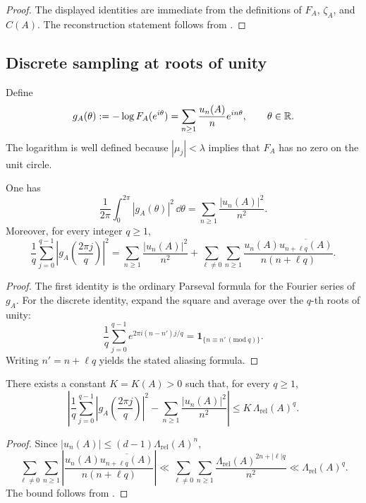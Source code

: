 \begin{proof}
  The displayed identities are immediate from the definitions of
  \(F_A\), \(\zeta_A\), and \(C(A)\). The reconstruction statement
  follows from
  .
\end{proof}

\subsection{Discrete sampling at roots of unity}

Define
\[
  g_A(\theta):=-\log F_A(e^{i\theta})
  =\sum_{n\ge 1}\frac{u_n(A)}{n}e^{in\theta},
  \qquad \theta\in\mathbb{R}.
\]
The logarithm is well defined because \(|\mu_j|<\lambda\) implies that
\(F_A\) has no zero on the unit circle.

\begin{theorem}
  \label{thm:finite-part-nyquist-parseval-aliasing}
  One has
  \[
    \frac{1}{2\pi}\int_0^{2\pi}|g_A(\theta)|^2\,\dd\theta
    =\sum_{n\ge 1}\frac{|u_n(A)|^2}{n^2}.
  \]
  Moreover, for every integer \(q\ge 1\),
  \[
    \frac{1}{q}\sum_{j=0}^{q-1}
      \left|g_A\!\left(\frac{2\pi j}{q}\right)\right|^2
    =
    \sum_{n\ge 1}\frac{|u_n(A)|^2}{n^2}
    +\sum_{\ell\ne 0}\sum_{n\ge 1}
      \frac{u_n(A)\overline{u_{n+\ell q}(A)}}{n(n+\ell q)}.
  \]
\end{theorem}

\begin{proof}
  The first identity is the ordinary Parseval formula for the Fourier
  series of \(g_A\). For the discrete identity, expand the square and
  average over the \(q\)-th roots of unity:
  \[
    \frac{1}{q}\sum_{j=0}^{q-1}
      e^{2\pi i (n-n')j/q}
    =\mathbf 1_{\{n\equiv n'\,(\mathrm{mod}\ q)\}}.
  \]
  Writing \(n'=n+\ell q\) yields the stated aliasing formula.
\end{proof}

\begin{corollary}
  \label{cor:finite-part-nyquist-error-exp}
  There exists a constant \(K=K(A)>0\) such that, for every \(q\ge 1\),
  \[
    \left|
      \frac{1}{q}\sum_{j=0}^{q-1}
        \left|g_A\!\left(\frac{2\pi j}{q}\right)\right|^2
      -\sum_{n\ge 1}\frac{|u_n(A)|^2}{n^2}
    \right|
    \le K\,\Lambda_{\mathrm{rel}}(A)^q.
  \]
\end{corollary}

\begin{proof}
  Since \(|u_n(A)|\le (d-1)\Lambda_{\mathrm{rel}}(A)^n\),
  \[
    \sum_{\ell\ne 0}\sum_{n\ge 1}
      \left|
        \frac{u_n(A)\overline{u_{n+\ell q}(A)}}{n(n+\ell q)}
      \right|
    \ll
    \sum_{\ell\ne 0}\sum_{n\ge 1}
      \frac{\Lambda_{\mathrm{rel}}(A)^{2n+|\ell|q}}{n^2}
    \ll \Lambda_{\mathrm{rel}}(A)^q.
  \]
  The bound follows from
  .
\end{proof}

